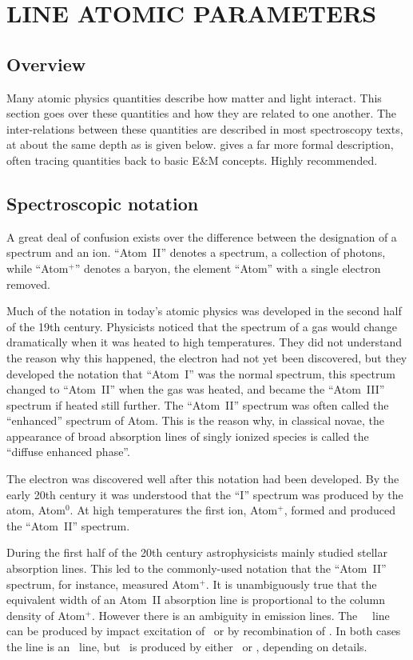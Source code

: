 \chapter{LINE ATOMIC PARAMETERS}

\section{Overview}

Many atomic physics quantities describe how matter and light interact.
This section goes over these quantities and how they are related to one
another.
The inter-relations between these quantities are described in most
spectroscopy texts, at about the same depth as is given below.  \citet{Hilborn1982} gives a far more formal description,
often tracing quantities back
to basic E\&M concepts.  Highly recommended.

\section{Spectroscopic notation}

A great deal of confusion exists over the difference between the
designation of a spectrum and an ion.  ``Atom~II'' denotes a spectrum, a
collection of photons, while ``Atom$^+$'' denotes a baryon,
the element ``Atom'' with a single electron removed.

Much of the notation in today's atomic physics was developed in the second
half of the 19th century.
Physicists noticed that the spectrum of a gas
would change dramatically when it was heated to high temperatures.
They
did not understand the reason why this happened,
the electron had not yet been discovered,
but they developed the
notation that ``Atom~I'' was the normal spectrum,
this spectrum changed
to ``Atom~II'' when the gas was heated,
and became the ``Atom~III'' spectrum if heated still further.
The ``Atom~II'' spectrum was often called the
``enhanced'' spectrum of Atom.
This is the reason why, in classical novae,
the appearance of broad absorption lines of singly ionized species
is called
the ``diffuse enhanced phase''.

The electron was discovered well after this notation had been developed.
By the early 20th century it was understood that the ``I'' spectrum was
produced by the atom, Atom$^0$.
At high temperatures the first ion, Atom$^+$,
formed and produced the ``Atom~II'' spectrum.

During the first half of the 20th century astrophysicists mainly studied
stellar absorption lines.
This led to the commonly-used notation that the
``Atom~II'' spectrum, for instance, measured Atom$^+$.
It is unambiguously true
that the equivalent width of an Atom~II absorption line is proportional
to the column density of Atom$^+$.
However there is an ambiguity in emission
lines.
The \la\ \hi\ line can be produced by impact excitation
of \hO\ or by recombination of \hplus.
In both cases the line is an \hi\ line, but \hi\ is
produced by either \hO\ or \hplus, depending on details.


